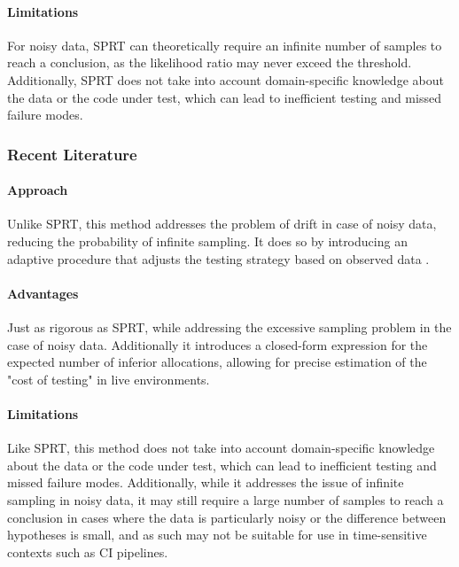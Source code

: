         \paragraph{Limitations} For noisy data, SPRT can theoretically require an infinite number of samples to reach a conclusion, as the likelihood ratio may never exceed the threshold. Additionally, SPRT does not take into account domain-specific knowledge about the data or the code under test, which can lead to inefficient testing and missed failure modes.

\subsubsection{Recent Literature}


        \paragraph{Approach} Unlike SPRT, this method addresses the problem of drift in case of noisy data, reducing the probability of infinite sampling. It does so by introducing an adaptive procedure that adjusts the testing strategy based on observed data \cite{kundu2025efficientadaptivesequentialprocedure}.

        \paragraph{Advantages} Just as rigorous as SPRT, while addressing the excessive sampling problem in the case of noisy data. Additionally it introduces a closed-form expression for the expected number of inferior allocations, allowing for precise estimation of the "cost of testing" in live environments.

        \paragraph{Limitations} Like SPRT, this method does not take into account domain-specific knowledge about the data or the code under test, which can lead to inefficient testing and missed failure modes. Additionally, while it addresses the issue of infinite sampling in noisy data, it may still require a large number of samples to reach a conclusion in cases where the data is particularly noisy or the difference between hypotheses is small, and as such may not be suitable for use in time-sensitive contexts such as CI pipelines.


